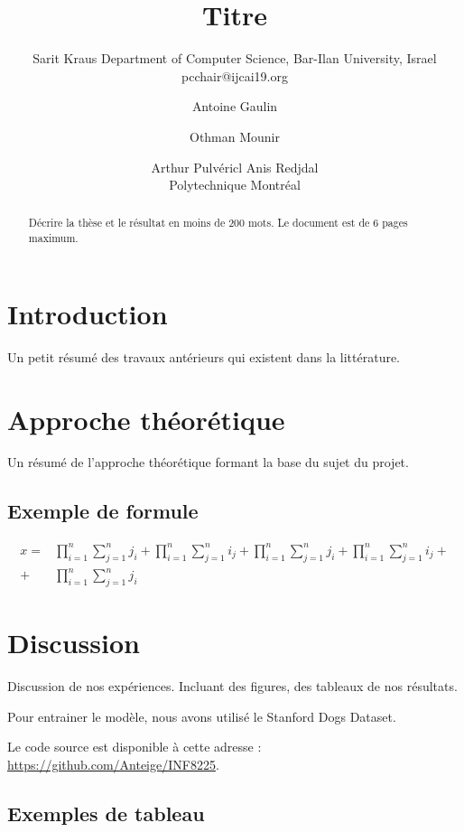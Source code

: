 \documentclass{article}
\title{Titre}
\author{
    Sarit Kraus
    \affiliations
    Department of Computer Science, Bar-Ilan University, Israel \emails
    pcchair@ijcai19.org
}
\author{
Antoine Gaulin\and
Othman Mounir\and
Arthur Pulvéricl\And
Anis Redjdal\\
\affiliations
Polytechnique Montréal\\
}
\begin{document}
\maketitle

\begin{abstract}
Décrire la thèse et le résultat en moins de 200 mots. Le document est de 6 pages maximum.
\end{abstract}

\section{Introduction}

Un petit résumé des travaux antérieurs qui existent dans la littérature.

\section{Approche théorétique}

Un résumé de l'approche théorétique formant la base du sujet du projet.

\subsection{Exemple de formule}

\begin{align}
    x =& \prod_{i=1}^n \sum_{j=1}^n j_i + \prod_{i=1}^n \sum_{j=1}^n i_j + \prod_{i=1}^n \sum_{j=1}^n j_i + \prod_{i=1}^n \sum_{j=1}^n i_j + \nonumber\\
    + & \prod_{i=1}^n \sum_{j=1}^n j_i
\end{align}

\section{Discussion}

Discussion de nos expériences. Incluant des figures, des tableaux de nos résultats.

Pour entrainer le modèle, nous avons utilisé le Stanford Dogs Dataset. ~\cite{KhoslaYaoJayadevaprakashFeiFei_FGVC2011}

Le code source est disponible à cette adresse : \url{https://github.com/Anteige/INF8225}.

\subsection{Exemples de tableau}
\end{document}
